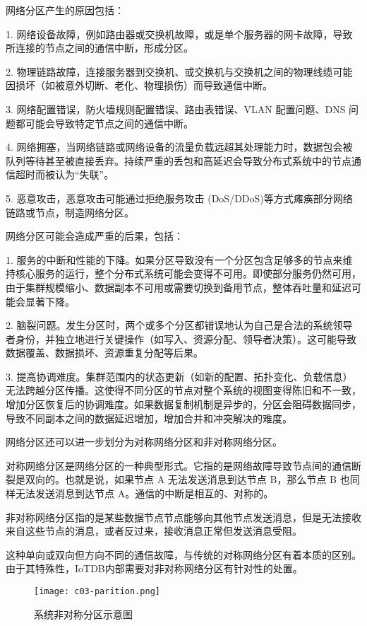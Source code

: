 网络分区产生的原因包括：

1. 网络设备故障，例如路由器或交换机故障，或是单个服务器的网卡故障，导致所连接的节点之间的通信中断，形成分区。

2. 物理链路故障，连接服务器到交换机、或交换机与交换机之间的物理线缆可能因损坏（如被意外切断、老化、物理损伤）而导致通信中断。

3. 网络配置错误，防火墙规则配置错误、路由表错误、VLAN 配置问题、DNS 问题都可能会导致特定节点之间的通信中断。

4. 网络拥塞，当网络链路或网络设备的流量负载远超其处理能力时，数据包会被队列等待甚至被直接丢弃。持续严重的丢包和高延迟会导致分布式系统中的节点通信超时而被认为“失联”。

5. 恶意攻击，恶意攻击可能通过拒绝服务攻击 (DoS/DDoS)等方式瘫痪部分网络链路或节点，制造网络分区。

网络分区可能会造成严重的后果，包括：

1. 服务的中断和性能的下降。如果分区导致没有一个分区包含足够多的节点来维持核心服务的运行，整个分布式系统可能会变得不可用。即使部分服务仍然可用，由于集群规模缩小、数据副本不可用或需要切换到备用节点，整体吞吐量和延迟可能会显著下降。

2. 脑裂问题。发生分区时，两个或多个分区都错误地认为自己是合法的系统领导者身份，并独立地进行关键操作（如写入、资源分配、领导者决策）。这可能导致数据覆盖、数据损坏、资源重复分配等后果。

3. 提高协调难度。集群范围内的状态更新（如新的配置、拓扑变化、负载信息）无法跨越分区传播。这使得不同分区的节点对整个系统的视图变得陈旧和不一致，增加分区恢复后的协调难度。如果数据复制机制是异步的，分区会阻碍数据同步，导致不同副本之间的数据延迟增加，增加合并和冲突解决的难度。

网络分区还可以进一步划分为对称网络分区和非对称网络分区。

对称网络分区是网络分区的一种典型形式。它指的是网络故障导致节点间的通信断裂是双向的。也就是说，如果节点 A 无法发送消息到达节点 B，那么节点 B 也同样无法发送消息到达节点 A。通信的中断是相互的、对称的。

非对称网络分区指的是某些数据节点节点能够向其他节点发送消息，但是无法接收来自这些节点的消息，或者反过来，接收消息正常但发送消息受阻。

这种单向或双向但方向不同的通信故障，与传统的对称网络分区有着本质的区别。由于其特殊性，IoTDB内部需要对非对称网络分区有针对性的处置。

\begin{figure}
  \centering
  \texttt{[image: c03-parition.png]}
  \caption{系统非对称分区示意图}
  \label{fig:c03-partition}
\end{figure}

